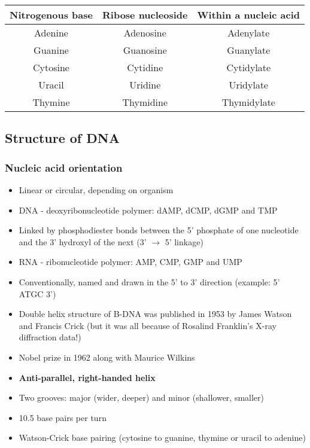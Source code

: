 \documentclass[letterpaper, 12pt]{article}
\begin{document}
\begin{table}[H]
\begin{tabular}{|c|c|c|}
\hline
\textbf{Nitrogenous base} & \textbf{Ribose nucleoside} & \textbf{Within a nucleic acid} \\\hline
Adenine & Adenosine & Adenylate \\\hline
Guanine & Guanosine & Guanylate \\\hline
Cytosine & Cytidine & Cytidylate \\\hline
Uracil & Uridine & Uridylate \\\hline
Thymine & Thymidine & Thymidylate \\\hline
\end{tabular}
\end{table}

\subsection*{Structure of DNA}

\subsubsection*{Nucleic acid orientation}
\begin{itemize}
\item Linear or circular, depending on organism
\item DNA - deoxyribonucleotide polymer: dAMP, dCMP, dGMP and TMP
\item Linked by phosphodiester bonds between the 5' phosphate of one nucleotide and the 3' hydroxyl of the next (3' $\to$ 5' linkage)
\item RNA - ribonucleotide polymer: AMP, CMP, GMP and UMP
\item Conventionally, named and drawn in the 5' to 3' direction (example: 5' ATGC 3')
\item Double helix structure of B-DNA was published in 1953 by James Watson and Francis Crick (but it was all because of Rosalind Franklin's X-ray diffraction data!)
\item Nobel prize in 1962 along with Maurice Wilkins
\item \textbf{Anti-parallel, right-handed helix}
\item Two grooves: major (wider, deeper) and minor (shallower, smaller)
\item 10.5 base pairs per turn
\item Watson-Crick base pairing (cytosine to guanine, thymine or uracil to adenine)
\end{itemize}
\end{document}
